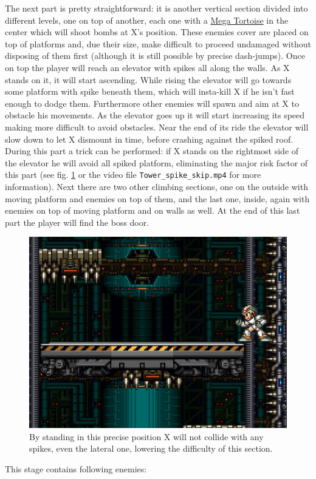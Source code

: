 The next part is pretty straightforward: it is another vertical section divided into different levels, one on top of another, each one with a \hyperlink{enem:Mega_Tortoise}{Mega Tortoise} in the center which will shoot bombs at X's position. These enemies cover are placed on top of platforms and, due their size, make difficult to proceed undamaged without disposing of them first (although it is still possible by precise dash-jumps). Once on top the player will reach an elevator with spikes all along the walls. As X stands on it, it will start ascending. While rising the elevator will go towards some platform with spike beneath them, which will insta-kill X if he isn't fast enough to dodge them. Furthermore other enemies will spawn and aim at X to obstacle his movements. As the elevator goes up it will start increasing its speed making more difficult to avoid obstacles. Near the end of its ride the elevator will slow down to let X dismount in time, before crashing against the spiked roof. During this part a trick can be performed: if X stands on the rightmost side of the elevator he will avoid all spiked platform, eliminating the major risk factor of this part (see fig. \ref{tower_spike} or the video file \texttt{Tower\_spike\_skip.mp4} for more information). Next there are two other climbing sections, one on the outside with moving platform and enemies on top of them, and the last one, inside, again with enemies on top of moving platform and on walls as well. At the end of this last part the player will find the boss door.
\begin{figure}[htp]
	\centering
	\includegraphics[width=0.5\linewidth]{figures/X1/Tower_spike_skip.jpg}
	\caption{By standing in this precise position X will not collide with any spikes, even the lateral one, lowering the difficulty of this section.}
	\label{tower_spike}
\end{figure}


This stage contains following enemies\cite{wiki:Tower}:

